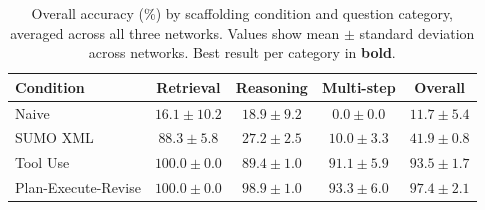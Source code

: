 \begin{table}[H]
\centering
\caption{Overall accuracy (\%) by scaffolding condition and question
category, averaged across all three networks.
Values show mean $\pm$ standard deviation across networks.
Best result per category in \textbf{bold}.}
\label{tab:headline}
\begin{tabular}{lcccc}
\toprule
\textbf{Condition} & \textbf{Retrieval} & \textbf{Reasoning} & \textbf{Multi-step} & \textbf{Overall} \\
\midrule
Naive        & $16.1 \pm 10.2$ & $18.9 \pm 9.2$ & $0.0 \pm 0.0$ & $11.7 \pm 5.4$ \\
SUMO XML     & $88.3 \pm 5.8$ & $27.2 \pm 2.5$ & $10.0 \pm 3.3$ & $41.9 \pm 0.8$ \\
Tool Use     & $\mathbf{100.0 \pm 0.0}$ & $89.4 \pm 1.0$ & $91.1 \pm 5.9$ & $93.5 \pm 1.7$ \\
Plan-Execute-Revise & $\mathbf{100.0 \pm 0.0}$ & $\mathbf{98.9 \pm 1.0}$ & $\mathbf{93.3 \pm 6.0}$ & $\mathbf{97.4 \pm 2.1}$ \\
\bottomrule
\end{tabular}
\end{table}
